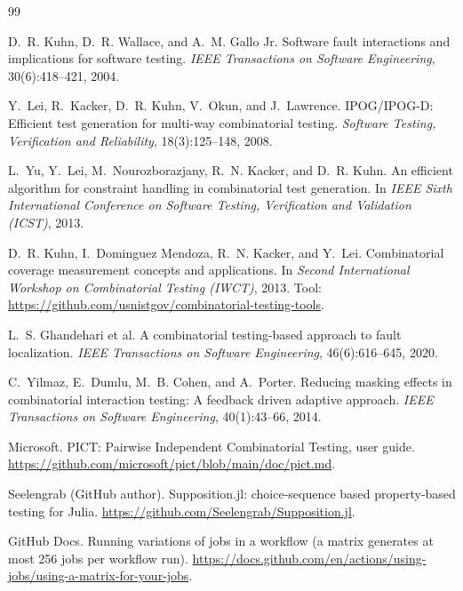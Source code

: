 \documentclass[11pt]{article}
\begin{document}
\begin{thebibliography}{99}\small

D.~R. Kuhn, D.~R. Wallace, and A.~M. Gallo Jr.
\newblock Software fault interactions and implications for software testing.
\newblock \emph{IEEE Transactions on Software Engineering}, 30(6):418--421, 2004.

Y.~Lei, R.~Kacker, D.~R. Kuhn, V.~Okun, and J.~Lawrence.
\newblock IPOG/IPOG-D: Efficient test generation for multi-way combinatorial testing.
\newblock \emph{Software Testing, Verification and Reliability}, 18(3):125--148, 2008.

L.~Yu, Y.~Lei, M.~Nourozborazjany, R.~N. Kacker, and D.~R. Kuhn.
\newblock An efficient algorithm for constraint handling in combinatorial test generation.
\newblock In \emph{IEEE Sixth International Conference on Software Testing, Verification and Validation (ICST)}, 2013.

D.~R. Kuhn, I.~Dominguez Mendoza, R.~N. Kacker, and Y.~Lei.
\newblock Combinatorial coverage measurement concepts and applications.
\newblock In \emph{Second International Workshop on Combinatorial Testing (IWCT)}, 2013.
\newblock Tool: \url{https://github.com/usnistgov/combinatorial-testing-tools}.

L.~S. Ghandehari et al.
\newblock A combinatorial testing-based approach to fault localization.
\newblock \emph{IEEE Transactions on Software Engineering}, 46(6):616--645, 2020.

C.~Yilmaz, E.~Dumlu, M.~B. Cohen, and A.~Porter.
\newblock Reducing masking effects in combinatorial interaction testing: A feedback driven adaptive approach.
\newblock \emph{IEEE Transactions on Software Engineering}, 40(1):43--66, 2014.

Microsoft.
\newblock PICT: Pairwise Independent Combinatorial Testing, user guide.
\newblock \url{https://github.com/microsoft/pict/blob/main/doc/pict.md}.

Seelengrab (GitHub author).
\newblock Supposition.jl: choice-sequence based property-based testing for Julia.
\newblock \url{https://github.com/Seelengrab/Supposition.jl}.

GitHub Docs.
\newblock Running variations of jobs in a workflow (a matrix generates at most 256 jobs per workflow run).
\newblock \url{https://docs.github.com/en/actions/using-jobs/using-a-matrix-for-your-jobs}.

\end{thebibliography}
\end{document}
